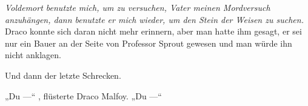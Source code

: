 \emph{Voldemort benutzte mich, um zu versuchen, Vater meinen Mordversuch anzuhängen, dann benutzte er mich wieder, um den Stein der Weisen zu suchen.}
Draco konnte sich daran nicht mehr erinnern, aber man hatte ihm gesagt, er sei nur ein Bauer an der Seite von Professor Sprout gewesen und man würde ihn nicht anklagen.

Und dann der letzte Schrecken.

„Du —“ , flüsterte Draco Malfoy.
„Du —“

